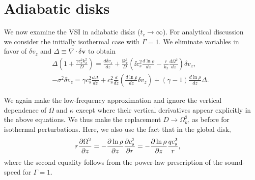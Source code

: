 \section{Adiabatic disks} 
We now examine the VSI in adiabatic disks ($t_c\to\infty$). For 
analytical discussion we consider the initially isothermal case with 
$\Gamma=1$. We eliminate variables in favor of $\delta v_z$ and
$\Delta \equiv \nabla\cdot\delta\bm{v}$ to obtain
\begin{align}
&\Delta\left(1 + \frac{\gamma c_s^2 k_x^2}{D}\right) = \frac{d\delta
  v_z}{dz} + \frac{\ii k_x^2}{D}\left(\ii c_s^2 \frac{d\ln\rho}{dz}
  - \frac{r}{k_x}\frac{d\Omega^2}{dz}\right)\delta v_z,\label{adia_iso1}\\
& -\sigma^2\delta v_z = \gamma c_s^2 \frac{d\Delta}{dz} +
 c_s^2\frac{d}{dz}\left(\frac{d\ln\rho}{dz}\delta v_z\right) +
 \left(\gamma-1\right)\frac{d\ln\rho}{dz} \Delta.\label{adia_iso2}
\end{align}

We again make the low-frequency approximation
and ignore the vertical dependence of $\Omega$ and $\kappa$ except
where their vertical derivatives appear explicitly in the above
equations. We thus make the replacement $D\to \Omega_k^2$, as before
for isothermal perturbations. Here, we also use
the fact that in the global disk,
\begin{align}
  r\frac{\partial \Omega^2}{\partial z} = - \frac{\partial\ln\rho}{\partial z}\frac{\partial
    c_s^2}{\partial r} = -\frac{\partial \ln\rho}{\partial z} \frac{qc_s^2}{r},
\end{align}
where the second equality follows from the power-law prescription of
the sound-speed for $\Gamma=1$. 

